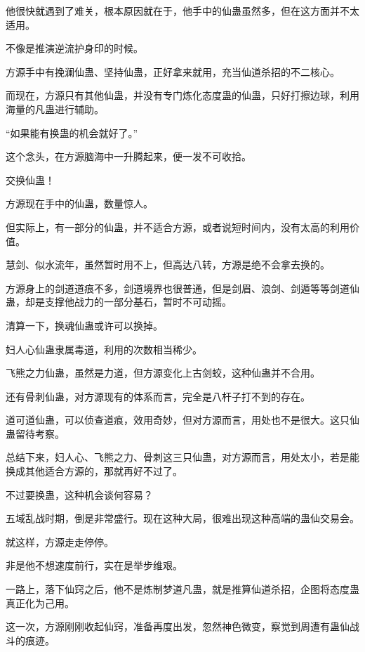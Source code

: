 \begin{this_body}
他很快就遇到了难关，根本原因就在于，他手中的仙蛊虽然多，但在这方面并不太适用。

不像是推演逆流护身印的时候。

方源手中有挽澜仙蛊、坚持仙蛊，正好拿来就用，充当仙道杀招的不二核心。

而现在，方源只有其他仙蛊，并没有专门炼化态度蛊的仙蛊，只好打擦边球，利用海量的凡蛊进行辅助。

“如果能有换蛊的机会就好了。”

这个念头，在方源脑海中一升腾起来，便一发不可收拾。

交换仙蛊！

方源现在手中的仙蛊，数量惊人。

但实际上，有一部分的仙蛊，并不适合方源，或者说短时间内，没有太高的利用价值。

慧剑、似水流年，虽然暂时用不上，但高达八转，方源是绝不会拿去换的。

方源身上的剑道道痕不多，剑道境界也很普通，但是剑眉、浪剑、剑遁等等剑道仙蛊，却是支撑他战力的一部分基石，暂时不可动摇。

清算一下，换魂仙蛊或许可以换掉。

妇人心仙蛊隶属毒道，利用的次数相当稀少。

飞熊之力仙蛊，虽然是力道，但方源变化上古剑蛟，这种仙蛊并不合用。

还有骨刺仙蛊，对方源现有的体系而言，完全是八杆子打不到的存在。

道可道仙蛊，可以侦查道痕，效用奇妙，但对方源而言，用处也不是很大。这只仙蛊留待考察。

总结下来，妇人心、飞熊之力、骨刺这三只仙蛊，对方源而言，用处太小，若是能换成其他适合方源的，那就再好不过了。

不过要换蛊，这种机会谈何容易？

五域乱战时期，倒是非常盛行。现在这种大局，很难出现这种高端的蛊仙交易会。

就这样，方源走走停停。

非是他不想速度前行，实在是举步维艰。

一路上，落下仙窍之后，他不是炼制梦道凡蛊，就是推算仙道杀招，企图将态度蛊真正化为己用。

这一次，方源刚刚收起仙窍，准备再度出发，忽然神色微变，察觉到周遭有蛊仙战斗的痕迹。

\end{this_body}

